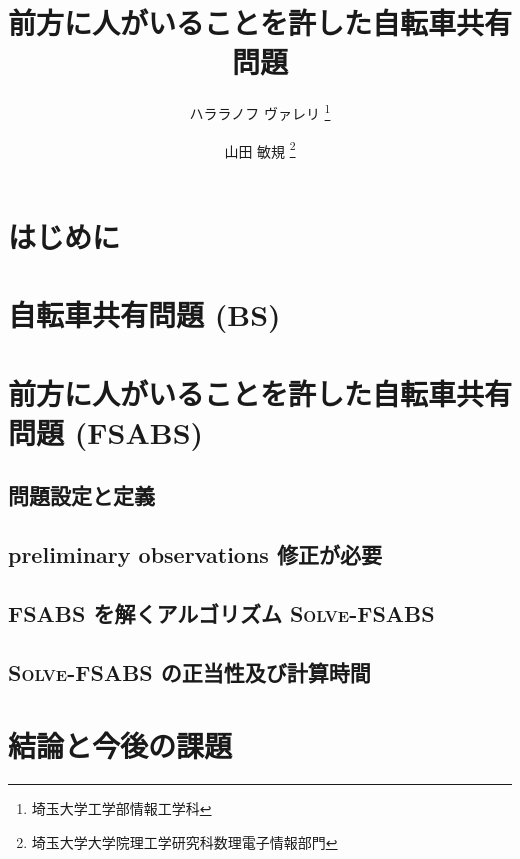 \documentclass{la-preprint}
\title{前方に人がいることを許した自転車共有問題}
\author{
	ハララノフ ヴァレリ \thanks{埼玉大学工学部情報工学科} \and
	山田 敏規 \thanks{埼玉大学大学院理工学研究科数理電子情報部門} \and
}
\date{}
\begin{document}
\section{はじめに}

\section{自転車共有問題 (BS)}

\section{前方に人がいることを許した自転車共有問題 (FSABS) }
\subsection{問題設定と定義}

\subsection{preliminary observations {\color{red}修正が必要}}

\subsection{FSABS を解くアルゴリズム \textsc{Solve-FSABS}}

\subsection{\textsc{Solve-FSABS} の正当性及び計算時間}

\section{結論と今後の課題}


\renewcommand{\refname}{参考文献}
\nocite{*}
\printbibliography


\end{document}
